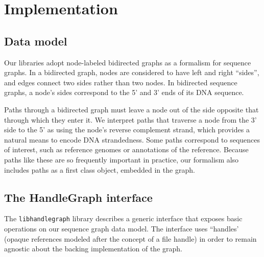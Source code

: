 \documentclass{article}
\begin{document}



\section{Implementation}

\subsection{Data model}

Our libraries adopt node-labeled bidirected graphs as a formalism for sequence graphs.
In a bidirected graph, nodes are considered to have left and right ``sides'', and edges connect two sides rather than two nodes.
In bidirected sequence graphs, a node's sides correspond to the 5' and 3' ends of its DNA sequence. 

Paths through a bidirected graph must leave a node out of the side opposite that through which they enter it.
We interpret paths that traverse a node from the 3' side to the 5' as using the node's reverse complement strand, which provides a natural means to encode DNA strandedness.
Some paths correspond to sequences of interest, such as reference genomes or annotations of the reference.
Because paths like these are so frequently important in practice, our formalism also includes paths as a first class object, embedded in the graph.

\subsection{The HandleGraph interface}

The \texttt{libhandlegraph} library describes a generic interface that exposes basic operations on our sequence graph data model.
The interface uses ``handles' (opaque references modeled after the concept of a file handle) in order to remain agnostic about the backing implementation of the graph.
\end{document}
